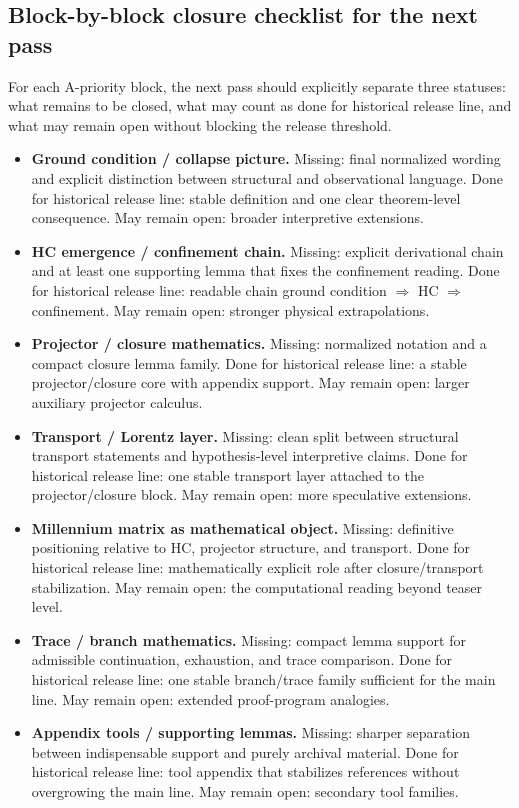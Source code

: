 \documentclass[12pt,a4paper]{article}
\DeclareRobustCommand{\QSCver}[1]{archival stage}
\renewcommand{\QSCver}[1]{historical release line}
\begin{document}
\subsection*{Block-by-block closure checklist for the next pass}
For each A-priority block, the next pass should explicitly separate three statuses: what remains to be closed, what may count as done for \QSCver{v2.27.0}, and what may remain open without blocking the release threshold.

\begin{itemize}
 \item \textbf{Ground condition / collapse picture.} Missing: final normalized wording and explicit distinction between structural and observational language. Done for \QSCver{v2.27.0}: stable definition and one clear theorem-level consequence. May remain open: broader interpretive extensions.
 \item \textbf{HC emergence / confinement chain.} Missing: explicit derivational chain and at least one supporting lemma that fixes the confinement reading. Done for \QSCver{v2.27.0}: readable chain ground condition $\Rightarrow$ HC $\Rightarrow$ confinement. May remain open: stronger physical extrapolations.
 \item \textbf{Projector / closure mathematics.} Missing: normalized notation and a compact closure lemma family. Done for \QSCver{v2.27.0}: a stable projector/closure core with appendix support. May remain open: larger auxiliary projector calculus.
 \item \textbf{Transport / Lorentz layer.} Missing: clean split between structural transport statements and hypothesis-level interpretive claims. Done for \QSCver{v2.27.0}: one stable transport layer attached to the projector/closure block. May remain open: more speculative extensions.
 \item \textbf{Millennium matrix as mathematical object.} Missing: definitive positioning relative to HC, projector structure, and transport. Done for \QSCver{v2.27.0}: mathematically explicit role after closure/transport stabilization. May remain open: the computational reading beyond teaser level.
 \item \textbf{Trace / branch mathematics.} Missing: compact lemma support for admissible continuation, exhaustion, and trace comparison. Done for \QSCver{v2.27.0}: one stable branch/trace family sufficient for the main line. May remain open: extended proof-program analogies.
 \item \textbf{Appendix tools / supporting lemmas.} Missing: sharper separation between indispensable support and purely archival material. Done for \QSCver{v2.27.0}: tool appendix that stabilizes references without overgrowing the main line. May remain open: secondary tool families.
\end{itemize}
\end{document}
